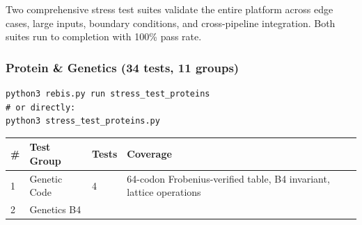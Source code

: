 Two comprehensive stress test suites validate the entire platform across
edge cases, large inputs, boundary conditions, and cross-pipeline
integration. Both suites run to completion with 100\% pass rate.

\hypertarget{protein-genetics-34-tests-11-groups}{%
\subsubsection{Protein \& Genetics (34 tests, 11
groups)}\label{protein-genetics-34-tests-11-groups}}

\begin{verbatim}
python3 rebis.py run stress_test_proteins
# or directly:
python3 stress_test_proteins.py
\end{verbatim}

\begin{longtable}[]{@{}llll@{}}
\toprule
\begin{minipage}[b]{0.09\columnwidth}\raggedright
\#\strut
\end{minipage} & \begin{minipage}[b]{0.31\columnwidth}\raggedright
Test Group\strut
\end{minipage} & \begin{minipage}[b]{0.20\columnwidth}\raggedright
Tests\strut
\end{minipage} & \begin{minipage}[b]{0.29\columnwidth}\raggedright
Coverage\strut
\end{minipage}\tabularnewline
\midrule
\endhead
\begin{minipage}[t]{0.09\columnwidth}\raggedright
1\strut
\end{minipage} & \begin{minipage}[t]{0.31\columnwidth}\raggedright
Genetic Code\strut
\end{minipage} & \begin{minipage}[t]{0.20\columnwidth}\raggedright
4\strut
\end{minipage} & \begin{minipage}[t]{0.29\columnwidth}\raggedright
64-codon Frobenius-verified table, B4 invariant, lattice
operations\strut
\end{minipage}\tabularnewline
\begin{minipage}[t]{0.09\columnwidth}\raggedright
2\strut
\end{minipage} & \begin{minipage}[t]{0.31\columnwidth}\raggedright
Genetics B4\strut
\end{minipage} & \begin{minipage}[t]{0.20\columnwidth}\raggedright

\end{minipage}
\end{longtable}
